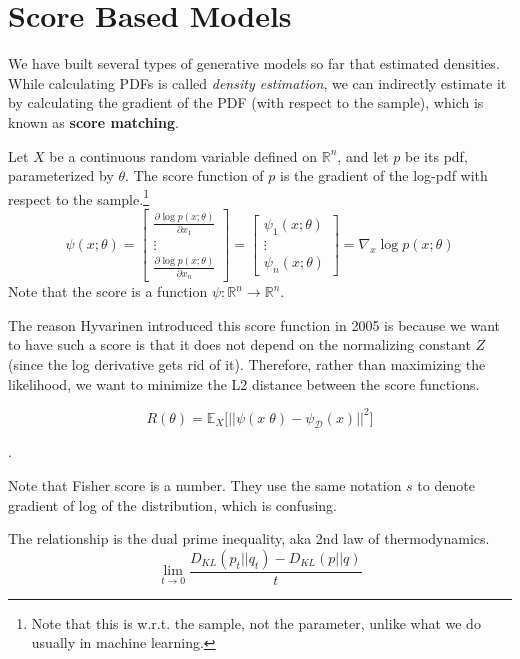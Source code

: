 \section{Score Based Models}

  We have built several types of generative models so far that estimated densities. While calculating PDFs is called \textit{density estimation}, we can indirectly estimate it by calculating the gradient of the PDF (with respect to the sample), which is known as \textbf{score matching}. 

  \begin{definition}[Score]
    Let $X$ be a continuous random variable defined on $\mathbb{R}^n$, and let $p$ be its pdf, parameterized by $\theta$. The score function of $p$ is the gradient of the log-pdf with respect to the sample.\footnote{Note that this is w.r.t. the sample, not the parameter, unlike what we do usually in machine learning.}
    \begin{equation}
      \psi (x; \theta) = \begin{bmatrix} \frac{\partial \log{p(x;\theta)}}{\partial x_1} \\ \vdots \\ \frac{\partial \log{p(x;\theta)}}{\partial x_n} \end{bmatrix} =  
      \begin{bmatrix}
        \psi_1 (x;\theta) \\ \vdots \\ \psi_n (x;\theta)
      \end{bmatrix} = 
      \nabla_x \log{p (x; \theta)}
    \end{equation}
    Note that the score is a function $\psi: \mathbb{R}^n \rightarrow \mathbb{R}^n$. 
  \end{definition} 

  The reason Hyvarinen introduced this score function in 2005 is because we want to have such a score is that it does not depend on the normalizing constant $Z$ (since the log derivative gets rid of it). \cite{orig_score} Therefore, rather than maximizing the likelihood, we want to minimize the L2 distance between the score functions. 

  \begin{equation}
    R(\theta) = \mathbb{E}_{X} \big[ || \psi(x\;\theta) - \psi_{\mathcal{D}} (x) ||^2 \big]
  \end{equation}

  \cite{score}. 

  Note that Fisher score is a number. They use the same notation $s$ to denote gradient of log of the distribution, which is confusing. 

  The relationship is the dual prime inequality, aka 2nd law of thermodynamics. 
  \begin{equation}
    \lim_{t \rightarrow 0} \frac{D_{KL}(p_t || q_t) - D_{KL}(p||q)}{t}
  \end{equation}
  
